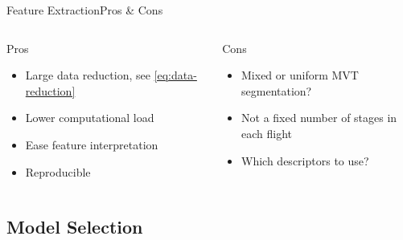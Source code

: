 \documentclass{beamer}
\begin{document}
            \begin{frame}{Feature Extraction}{Pros \& Cons}
                \begin{columns}
                    \begin{column}{0.45\textwidth}
                        \begin{exampleblock}{Pros}
                            \begin{itemize}
                                \item Large data reduction, see \eqref{eq:data-reduction}
                                \item Lower computational load
                                \item Ease feature interpretation
                                \item Reproducible
                            \end{itemize}
                        \end{exampleblock}
                    \end{column}
                    \begin{column}{0.45\textwidth}
                        \begin{alertblock}{Cons}
                            \begin{itemize}
                                \item Mixed or uniform MVT segmentation?
                                \item Not a fixed number of stages in each flight
                                \item Which descriptors to use?
                            \end{itemize}
                        \end{alertblock}
                    \end{column}
                \end{columns}
            \end{frame}

        \subsection{Model Selection}
\end{document}
